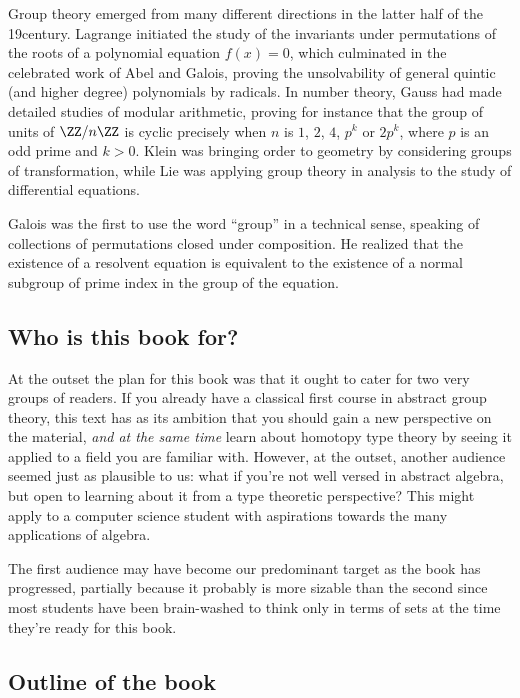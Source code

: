 
Group theory emerged from many different directions in the latter half of the 19\th century.
Lagrange initiated the study of the invariants under permutations
of the roots of a polynomial equation $f(x)=0$,
which culminated in the celebrated work of Abel and Galois,
proving the unsolvability of general quintic (and higher degree)
polynomials by radicals.
In number theory, Gauss had made detailed studies of modular arithmetic,
proving for instance that the group of units of
$\ZZ/n\ZZ$ is cyclic precisely when $n$ is $1$, $2$, $4$, $p^k$ or $2p^k$, where $p$ is an odd prime and $k > 0$.
Klein was bringing order to geometry by considering groups of transformation,
while Lie was applying group theory in analysis to the study of differential equations.

Galois was the first to use the word ``group'' in a technical sense,
speaking of collections of permutations closed under composition.
He realized that the existence of a resolvent equation is equivalent
to the existence of a normal subgroup of prime index
in the group of the equation.

\subsection{Who is this book for?}
\label{sec:who}
At the outset the plan for this book was that it ought to cater for two very groups of readers. If you already have a classical first course in abstract group theory, this text has as its ambition that you should gain a new perspective on the material, \emph{and at the same time} learn about homotopy type theory by seeing it applied to a field you are familiar with. However, at the outset, another audience seemed just as plausible to us: what if you're not well versed in abstract algebra, but open to learning about it from a type theoretic perspective? This might apply to a computer science student with aspirations towards the many applications of algebra.

The first audience may have become our predominant target as the book has progressed, partially because it probably is more sizable than the second since most students have been brain-washed to think only in terms of sets at the time they're ready for this book.

\subsection{Outline of the book}
\label{sec:outline}

